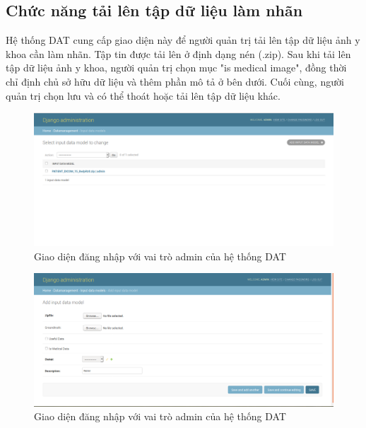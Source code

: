 \subsection{Chức năng tải lên tập dữ liệu làm nhãn}
Hệ thống DAT cung cấp giao diện này để người quản trị tải lên tập dữ liệu ảnh y khoa cần làm nhãn. Tập tin được tải lên ở định dạng nén (.zip). Sau khi tải lên tập dữ liệu ảnh y khoa, người quản trị chọn mục "is medical image", đồng thời chỉ định chủ sở hữu dữ liệu và thêm phần mô tả ở bên dưới. Cuối cùng, người quản trị chọn lưu và có thể thoát hoặc tải lên tập dữ liệu khác.

\begin{figure}[H]
    \centering
    \includegraphics[width=14cm]{images/chapter-07-images/admin-input-data-model-1.png}
    \caption{Giao diện đăng nhập với vai trò admin của hệ thống DAT}
\end{figure}

\begin{figure}[H]
    \centering
    \includegraphics[width=14cm]{images/chapter-07-images/admin-input-data-model-2.png}
    \caption{Giao diện đăng nhập với vai trò admin của hệ thống DAT}
\end{figure}

